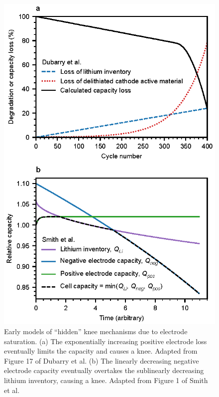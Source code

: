 \documentclass[journal=jpclcd,manuscript=article]{achemso}
\begin{document}
\begin{figure}[hp]
\centering
\includegraphics[scale = 1]{figures/electrode_saturation.eps}
\caption{Early models of ``hidden'' knee mechanisms due to electrode saturation. (a) The exponentially increasing positive electrode loss eventually limits the capacity and causes a knee. Adapted from Figure 17 of Dubarry et al.\cite{dubarry_synthesize_2012}
(b) The linearly decreasing negative electrode capacity eventually overtakes the sublinearly decreasing lithium inventory, causing a knee. Adapted from Figure 1 of Smith et al.\cite{smith_life_2017}
}
\label{fig:electrode_sat_simple}
\end{figure}
\end{document}
